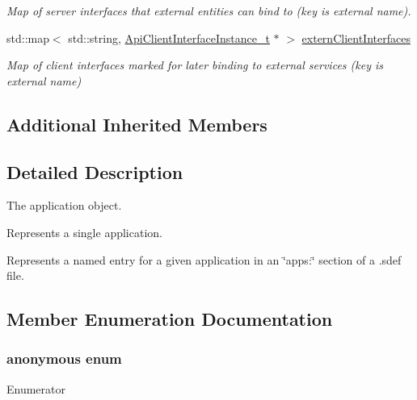 \begin{DoxyCompactItemize}
\begin{DoxyCompactList}\small\item\em Map of server interfaces that external entities can bind to (key is external name). \end{DoxyCompactList}\item 
std\+::map$<$ std\+::string, \hyperlink{struct_api_client_interface_instance__t}{Api\+Client\+Interface\+Instance\+\_\+t} $\ast$ $>$ \hyperlink{struct_app__t_ac04a0e6623cf0b9b2c6873e45d74bd1d}{extern\+Client\+Interfaces}
\begin{DoxyCompactList}\small\item\em Map of client interfaces marked for later binding to external services (key is external name) \end{DoxyCompactList}\end{DoxyCompactItemize}
\subsection*{Additional Inherited Members}


\subsection{Detailed Description}
The application object.

Represents a single application.

Represents a named entry for a given application in an \char`\"{}apps\+:\char`\"{} section of a .sdef file. 

\subsection{Member Enumeration Documentation}
\subsubsection[{\texorpdfstring{anonymous enum}{anonymous enum}}]{\setlength{\rightskip}{0pt plus 5cm}anonymous enum}\hypertarget{struct_app__t_a5e83b2b466859d023f75d213296d45bb}{}\label{struct_app__t_a5e83b2b466859d023f75d213296d45bb}
\begin{Desc}
\item[Enumerator]\par
\begin{description}
\item[{\em 
A\+U\+TO\hypertarget{struct_app__t_a5e83b2b466859d023f75d213296d45bba8e562f1ce440faab4559e50ae787d9f2}{}\label{struct_app__t_a5e83b2b466859d023f75d213296d45bba8e562f1ce440faab4559e50ae787d9f2}
}]\item[{\em 
M\+A\+N\+U\+AL\hypertarget{struct_app__t_a5e83b2b466859d023f75d213296d45bbab7494cd8bd02a875606473d500db1b74}{}\label{struct_app__t_a5e83b2b466859d023f75d213296d45bbab7494cd8bd02a875606473d500db1b74}
}]\end{description}
\end{Desc}


